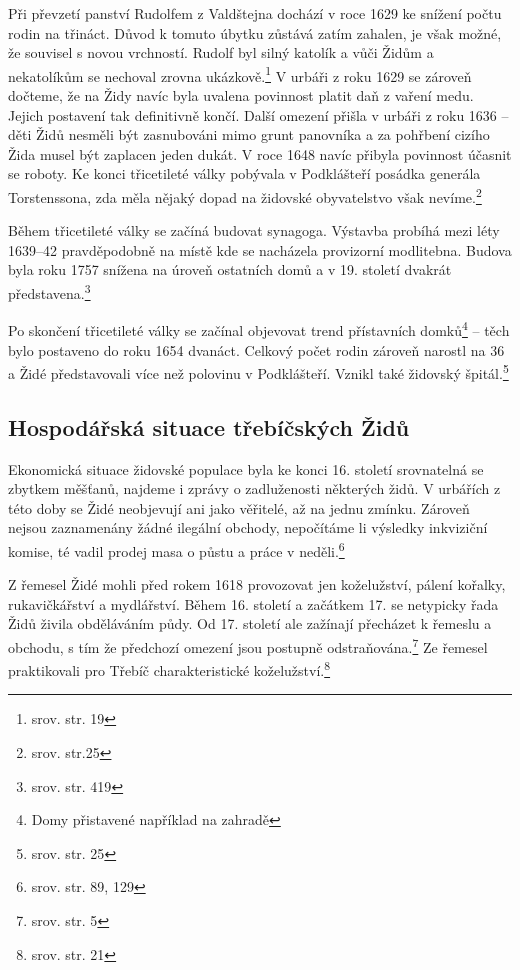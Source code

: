 \documentclass[a4paper,oneside,12pt]{report}
\begin{document}
Při převzetí panství Rudolfem z Valdštejna dochází v roce 1629 ke snížení počtu rodin na třináct.
Důvod k tomuto úbytku zůstává zatím zahalen, je však možné, že souvisel s novou vrchností.
Rudolf byl silný katolík a vůči Židům a nekatolíkům se nechoval zrovna ukázkově.\footnote{srov.  str. 19}
V urbáři z roku 1629 se zároveň dočteme, že na Židy navíc byla uvalena povinnost platit daň z vaření medu.
Jejich  postavení tak definitivně končí.
Další omezení přišla v urbáři z roku 1636 -- děti Židů nesměli být zasnubováni mimo grunt panovníka a za pohřbení cizího Žida musel být zaplacen jeden dukát.
V roce 1648 navíc přibyla povinnost účasnit se roboty.
Ke konci třicetileté války pobývala v Podklášteří posádka generála Torstenssona, zda měla nějaký dopad na židovské obyvatelstvo však nevíme.\footnote{srov. \cite{Fiser2005} str.25}

Během třicetileté války se začíná budovat  synagoga.
Výstavba probíhá mezi léty 1639--42 pravděpodobně na místě kde se nacházela provizorní modlitebna.
Budova byla roku 1757 snížena na úroveň ostatních domů a v 19. století dvakrát představena.\footnote{srov. \cite{Pekny2001} str. 419}

Po skončení třicetileté války se začínal objevovat trend přístavních domků\footnote{Domy přistavené například na zahradě} -- těch bylo postaveno do roku 1654 dvanáct.
Celkový počet rodin zároveň narostl na 36 a Židé představovali více než polovinu v Podklášteří.
Vznikl také židovský špitál.\footnote{srov. \cite{Fiser2005} str. 25}

\subsection{Hospodářská situace třebíčských Židů}

Ekonomická situace židovské populace byla ke konci 16. století srovnatelná se zbytkem měšťanů, najdeme i zprávy o zadluženosti některých židů.
V urbářích z této doby se Židé neobjevují ani jako věřitelé, až na jednu zmínku.
Zároveň nejsou zaznamenány žádné ilegální obchody, nepočítáme li výsledky inkviziční komise, té vadil prodej masa o půstu a práce v neděli.\footnote{srov. \cite{Uhlir1978} str. 89, 129}

Z řemesel Židé mohli před rokem 1618 provozovat jen koželužství, pálení kořalky, rukavičkářství a mydlářství.
Během 16. století a začátkem 17. se netypicky řada Židů živila obděláváním půdy.
Od 17. století ale zažínají přecházet k řemeslu a obchodu, s tím že předchozí omezení jsou postupně odstraňována.\footnote{srov. \cite{Klenovsky2003} str. 5}
Ze řemesel praktikovali pro Třebíč charakteristické koželužství.\footnote{srov.  str. 21}
\end{document}
